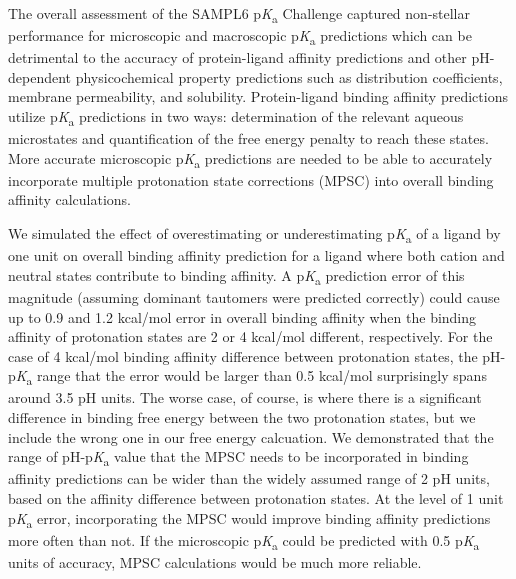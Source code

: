 \documentclass[9pt,lineno,final]{elife}
\newcommand{\pKa}{p\textit{K}\textsubscript{a}}
\begin{document}

The overall assessment of the SAMPL6 \pKa{} Challenge captured non-stellar performance for microscopic and macroscopic \pKa{} predictions which can be detrimental to the accuracy of protein-ligand affinity predictions and other pH-dependent physicochemical property predictions such as distribution coefficients, membrane permeability, and solubility.
Protein-ligand binding affinity predictions utilize \pKa{} predictions in two ways: determination of the relevant aqueous microstates and quantification of the free energy penalty to reach these states. 
More accurate microscopic \pKa{} predictions are needed to be able to accurately incorporate multiple protonation state corrections (MPSC) into overall binding affinity calculations. 

We simulated the effect of overestimating or underestimating \pKa{} of a ligand by one unit on overall binding affinity prediction for a ligand where both cation and neutral states contribute to binding affinity. 
A \pKa{} prediction error of this magnitude (assuming dominant tautomers were predicted correctly) could cause up to 0.9 and 1.2 kcal/mol error in overall binding affinity when the binding affinity of protonation states are 2 or 4 kcal/mol different, respectively. 
For the case of 4 kcal/mol binding affinity difference between protonation states, the pH-\pKa{} range that the error would be larger than 0.5 kcal/mol surprisingly spans around 3.5 pH units. 
The worse case, of course, is where there is a significant difference in binding free energy between the two protonation states, but we include the wrong one in our free energy calcuation.
We demonstrated that the range of pH-\pKa{} value that the MPSC needs to be incorporated in binding affinity predictions can be wider than the widely assumed range of 2 pH units, based on the affinity difference between protonation states. 
At the level of 1 unit \pKa{} error, incorporating the MPSC would improve binding affinity predictions more often than not. 
If the microscopic \pKa{} could be predicted with 0.5 \pKa{} units of accuracy, MPSC calculations would be much more reliable.
\end{document}
